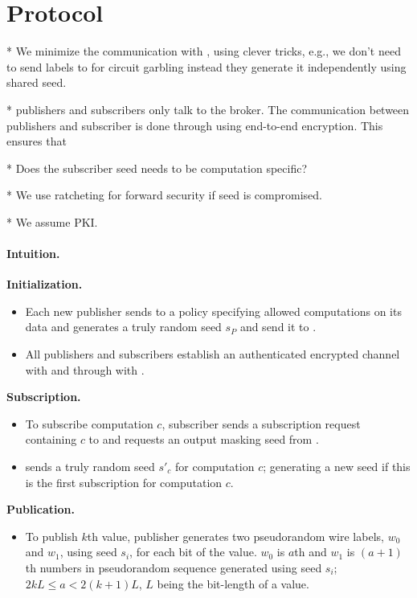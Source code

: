 \section{Protocol}
\label{sec:protocol}

* We minimize the communication with \garbler, using clever tricks, e.g.,
we don't need to send labels to \garbler for circuit garbling instead they
generate it independently using shared seed.

* publishers and subscribers only talk to the broker. The communication
between publishers and subscriber is done through \broker using end-to-end
encryption. This ensures that 

* Does the subscriber seed needs to be computation specific?

* We use ratcheting for forward security if seed is compromised.

* We assume PKI.

\paragraph{Intuition.}


\noindent\textbf{Initialization.}
\begin{itemize}[leftmargin=*]
 
  \item Each new publisher sends to \broker a policy specifying allowed
	computations on its data and generates a truly random seed $s_P$ and send
	it to \garbler.
  \item All publishers and subscribers establish an authenticated encrypted
	channel with \broker and through \broker with \garbler.

\end{itemize}

\noindent\textbf{Subscription.}
\begin{itemize}[leftmargin=*]

	\item To subscribe computation $c$, subscriber sends a subscription request
	  containing $c$ to \broker and requests an output masking seed from
	  \garbler.  
	\item \garbler sends a truly random seed $s'_c$ for computation $c$;
	  generating a new seed if this is the first subscription for computation
	  $c$. 
\end{itemize}

\noindent\textbf{Publication.}
\begin{itemize}[leftmargin=*]
		
	\item To publish $k$th value, publisher generates two pseudorandom wire
	  labels, $w_0$ and $w_1$, using seed $s_i$, for each bit of the value.
	  $w_0$ is $a$th and $w_1$ is $(a+1)$th numbers in pseudorandom sequence
	  generated using seed $s_i$; $2kL \leq a < 2(k+1)L$, $L$ being the
	  bit-length of a value.

\end{itemize}

